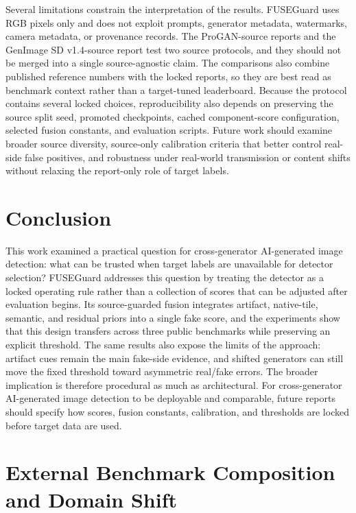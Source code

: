 \documentclass[letterpaper,journal]{IEEEtran}
\begin{document}
Several limitations constrain the interpretation of the results. FUSEGuard uses RGB pixels only and does not exploit prompts, generator metadata, watermarks, camera metadata, or provenance records. The ProGAN-source reports and the GenImage SD v1.4-source report test two source protocols, and they should not be merged into a single source-agnostic claim. The comparisons also combine published reference numbers with the locked reports, so they are best read as benchmark context rather than a target-tuned leaderboard. Because the protocol contains several locked choices, reproducibility also depends on preserving the source split seed, promoted checkpoints, cached component-score configuration, selected fusion constants, and evaluation scripts. Future work should examine broader source diversity, source-only calibration criteria that better control real-side false positives, and robustness under real-world transmission or content shifts without relaxing the report-only role of target labels.

\section{Conclusion}
\label{sec:conclusion}
This work examined a practical question for cross-generator AI-generated image detection: what can be trusted when target labels are unavailable for detector selection? FUSEGuard addresses this question by treating the detector as a locked operating rule rather than a collection of scores that can be adjusted after evaluation begins. Its source-guarded fusion integrates artifact, native-tile, semantic, and residual priors into a single fake score, and the experiments show that this design transfers across three public benchmarks while preserving an explicit threshold. The same results also expose the limits of the approach: artifact cues remain the main fake-side evidence, and shifted generators can still move the fixed threshold toward asymmetric real/fake errors. The broader implication is therefore procedural as much as architectural. For cross-generator AI-generated image detection to be deployable and comparable, future reports should specify how scores, fusion constants, calibration, and thresholds are locked before target data are used.

\clearpage
\appendices
\section{External Benchmark Composition and Domain Shift}
\end{document}
